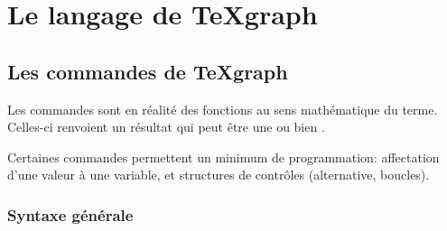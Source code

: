 \chapter{Le langage de TeXgraph}

\section{Les commandes de TeXgraph}\label{chapCommandes}

Les commandes sont en réalité des fonctions au sens mathématique du terme. Celles-ci renvoient un résultat qui peut être une  ou bien \Nil{}.

Certaines commandes permettent un minimum de programmation: affectation d'une valeur à une variable, et structures de contrôles (alternative, boucles).


\subsection{Syntaxe générale}

